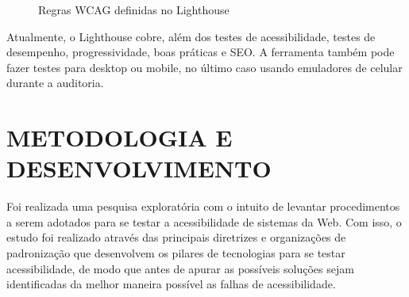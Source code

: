 \documentclass[
	12pt,				%
	openright,			%
	oneside,			%
	a4paper,			%
	chapter=TITLE,		%
	section=TITLE,		%
	subsection=TITLE,	%
	subsubsection=TITLE,%
	english,			%
	brazil				%
	]{abntex2}
\theoremstyle{definition}
\begin{document}
\begin{itemize}
\begin{figure}[!h]
\centering
\caption{Regras WCAG definidas no Lighthouse}
\label{Regras WCAG definidas no Lighthouse}
\end{figure}

\pagebreak

Atualmente, o Lighthouse cobre, além dos testes de acessibilidade, testes de desempenho, progressividade, boas práticas e SEO. A ferramenta também pode fazer testes para desktop ou mobile, no último caso usando emuladores de celular durante a auditoria.
    
\end{itemize}

\chapter{METODOLOGIA E DESENVOLVIMENTO}

Foi realizada uma pesquisa exploratória com o intuito de levantar procedimentos a serem adotados para se testar a acessibilidade de sistemas da Web. Com isso, o estudo foi realizado através das principais diretrizes e organizações de padronização que desenvolvem os pilares de tecnologias para se testar acessibilidade, de modo que antes de apurar as possíveis soluções sejam identificadas da melhor maneira possível as falhas de acessibilidade.
\end{document}
